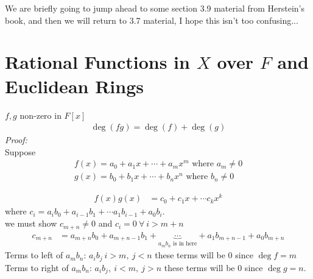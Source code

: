 \setcounter{section}{8}
\begin{tcolorbox}
    We are briefly going to jump ahead to some section 3.9 material from Herstein's book, and then
    we will return to 3.7 material, I hope this isn't too confusing...
\end{tcolorbox}
\section{Rational Functions in $X$ over $F$ and Euclidean Rings}
\begin{lemma}
    $f,g$ non-zero in $F[x]$
    \begin{align}
        \deg(fg)= \deg(f)+\deg(g) \nonumber
    \end{align}
    \textit{Proof:} \\
    \noindent Suppose
    \begin{align}
        f(x)= a_0 +a_1x+\cdots + a_mx^m \text{ where } a_m \neq 0 \nonumber \\
        g(x)= b_0 +b_1x + \cdots + b_nx^n \text{ where } b_n\neq 0 \nonumber
    \end{align}

    \begin{align}
        f(x)g(x) &= c_0 + c_1x + \cdots c_kx^k \nonumber
    \end{align}
    where $c_i = a_ib_0 + a_{i-1}b_1 + \cdots a_1b_{i-1} + a_0 b_i$. \\
    \noindent we must show $c_{m+n}\neq 0$ and $c_i = 0 \ \forall \ i >m+n$
    \begin{align}
        c_{m+n} &= a_{m+n} b_0 + a_{m+n-1}b_1 + \underbrace{\cdots}_{a_mb_n \text{ is in here}}+ a_1b_{m+n-1}+a_0b_{m+n} \nonumber
    \end{align}
    Terms to left of $a_mb_n$: $a_ib_j \ i>m, \ j <n$ these terms will be $0$ since $\deg f = m$ \\
    \noindent Terms to right of $a_mb_n$: $a_ib_j, \ i<m, \ j>n$ these terms will be $0$ since
    $\deg g = n$. \\


\end{lemma}
